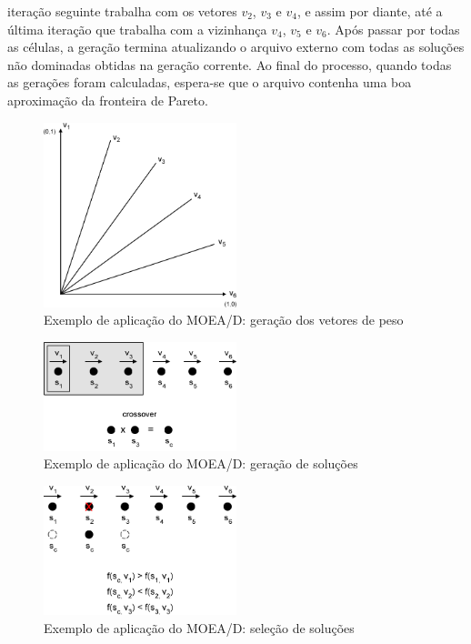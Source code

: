 iteração seguinte trabalha com os vetores $v_2$, $v_3$ e $v_4$, e assim por diante, até a última iteração que trabalha com a vizinhança $v_4$, $v_5$ e $v_6$. Após passar por todas as células, a geração termina atualizando o arquivo externo com todas as soluções não dominadas obtidas na geração corrente. Ao final do processo, quando todas as gerações foram calculadas, espera-se que o arquivo contenha uma boa aproximação da fronteira de Pareto.

\begin{figure}[!htbp]
	\centering
	\includegraphics[width=0.5\textwidth]{cap_otimizacao-multi/figs/moead-ex1}
	\caption{\label{fig_moead_ex1}Exemplo de aplicação do MOEA/D: geração dos vetores de peso}
\end{figure}

\begin{figure}[!htbp]
	\centering
	\includegraphics[width=0.5\textwidth]{cap_otimizacao-multi/figs/moead-ex2}
	\caption{\label{fig_moead_ex2}Exemplo de aplicação do MOEA/D: geração de soluções}
\end{figure}

\begin{figure}[!htbp]
	\centering
	\includegraphics[width=0.5\textwidth]{cap_otimizacao-multi/figs/moead-ex3}
	\caption{\label{fig_moead_ex3}Exemplo de aplicação do MOEA/D: seleção de soluções}
\end{figure}


